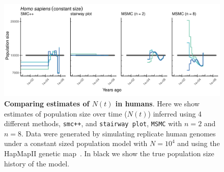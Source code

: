 \documentclass[12pt,halfline,a4paper]{ouparticle}
\newcommand{\MSMC}{\texttt{MSMC}\xspace}
\newcommand{\smcpp}{\texttt{smc++}\xspace}
\begin{document}
\begin{figure}
\begin{center}
\includegraphics[width=0.8\linewidth]{display_items/homo_sapiens_constant.png}
\caption{\textbf{Comparing estimates of $N(t)$ in humans}. Here we show estimates of population
size over time ($N(t)$) inferred using 4 different methods, \smcpp, and \texttt{stairway plot},
\MSMC with $n=2$ and $n=8$. Data were generated by simulating
replicate human genomes under a constant sized population model with $N=10^4$ and using the
HapMapII genetic map~\citep{international2007second}. In black we show the true population size history
of the model.}
\label{fig:n_t_HomSap_constant}
\end{center}
\end{figure}
\end{document}
